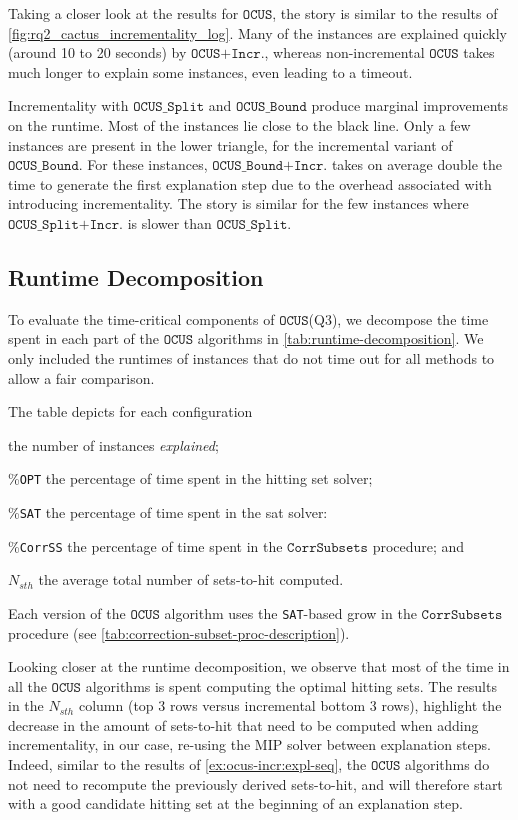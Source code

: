 \documentclass[twoside,11pt]{article}
\newcommand\mm[1]{\ensuremath{#1}\xspace}
\newcommand\call[1]{\mm{\texttt{#1}}}
\newcommand\sat{\texttt{{SAT}}\xspace}
\newcommand\comus{\mm{\call{OCUS}}}
\newcommand{\comusbound}{\mm{\call{OCUS\_Bound}}}
\newcommand{\comussplit}{\mm{\call{OCUS\_Split}}}
\newcommand\comusincr{\mm{\call{OCUS+Incr.}}}
\newcommand\ousbincr{\mm{\call{OCUS\_Bound+Incr.}}}
\newcommand\ousbiterincr{\mm{\call{OCUS\_Split+Incr.}}}
\newcommand\corrsubsets{\mm{\call{CorrSubsets}}}
\begin{document}
Taking a closer look at the results for \comus, the story is similar to the results of \cref{fig:rq2_cactus_incrementality_log}. Many of the instances are explained quickly (around 10 to 20 seconds) by \comusincr, whereas non-incremental \comus takes much longer to explain some instances, even leading to a timeout.

Incrementality with \comussplit and \comusbound produce marginal improvements on the runtime. Most of the instances lie close to the black line.
Only a few instances are present in the lower triangle, for the incremental variant of \comusbound. For these instances, \ousbincr takes on average double the time to generate the first explanation step due to the overhead associated with introducing incrementality. The story is similar for the few instances where \ousbiterincr is slower than \comussplit.

\subsection{Runtime Decomposition} To evaluate the time-critical components of \comus (Q3), we decompose the time spent in each part of the \call{OCUS} algorithms in \cref{tab:runtime-decomposition}. We only included the runtimes of instances that do not time out for all methods to allow a fair comparison. 

	The table depicts for each configuration 
\begin{inparaenum}[(1)]
	\item the number of instances \emph{explained};
	\item \%\texttt{OPT} the percentage of time spent in the hitting set solver;
	\item \%\sat the percentage of time spent in the sat solver:
	\item \%\texttt{CorrSS} the percentage of time spent in the \corrsubsets procedure; and
	\item $N_{sth}$ the average total number of sets-to-hit computed.
\end{inparaenum}
Each version of the \comus algorithm uses the \sat-based grow in the \corrsubsets procedure (see \cref{tab:correction-subset-proc-description}).

Looking closer at the runtime decomposition, we observe that most of the time in all the \comus algorithms is spent computing the optimal hitting sets.
The results in the $N_{sth}$ column (top 3 rows versus incremental bottom 3 rows), highlight the decrease in the amount of sets-to-hit that need to be computed when adding incrementality, in our case, re-using the MIP solver between explanation steps. 
Indeed, similar to the results of \cref{ex:ocus-incr:expl-seq}, the \comus algorithms do not need to recompute the previously derived sets-to-hit, and will therefore start with a good candidate hitting set at the beginning of an explanation step.
\end{document}
